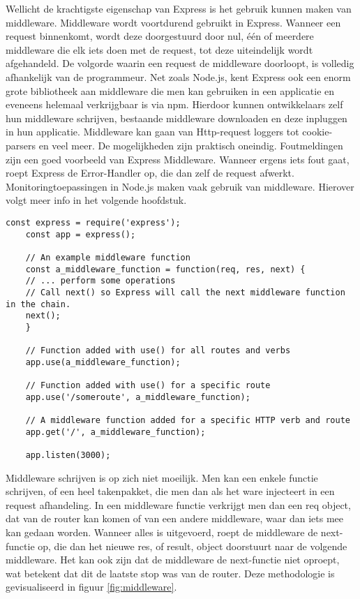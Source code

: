 Wellicht de krachtigste eigenschap van Express is het gebruik kunnen maken van middleware. Middleware wordt voortdurend gebruikt in Express. Wanneer een request binnenkomt, wordt deze doorgestuurd door nul, één of meerdere middleware die elk iets doen met de request, tot deze uiteindelijk wordt afgehandeld. De volgorde waarin een request de middleware doorloopt, is volledig afhankelijk van de programmeur. Net zoals Node.js, kent Express ook een enorm grote bibliotheek aan middleware die men kan gebruiken in een applicatie en eveneens helemaal verkrijgbaar is via npm. Hierdoor kunnen ontwikkelaars zelf hun middleware schrijven, bestaande middleware downloaden en deze inpluggen in hun applicatie. Middleware kan gaan van Http-request loggers tot cookie-parsers en veel meer. De mogelijkheden zijn praktisch oneindig. Foutmeldingen zijn een goed voorbeeld van Express Middleware. Wanneer ergens iets fout gaat, roept Express de Error-Handler op, die dan zelf de request afwerkt. Monitoringtoepassingen in Node.js maken vaak gebruik van middleware. Hierover volgt meer info in het volgende hoofdstuk.

\begin{minipage}{\linewidth}
	\begin{lstlisting}[style=ES6,
						caption={Express code flow voorbeeld.},
						label=code:expressexample]
	const express = require('express');
	const app = express();
	
	// An example middleware function
	const a_middleware_function = function(req, res, next) {
	// ... perform some operations
	// Call next() so Express will call the next middleware function in the chain.
	next();
	}
	
	// Function added with use() for all routes and verbs
	app.use(a_middleware_function);
	
	// Function added with use() for a specific route
	app.use('/someroute', a_middleware_function);
	
	// A middleware function added for a specific HTTP verb and route
	app.get('/', a_middleware_function);
	
	app.listen(3000);
	\end{lstlisting}
\end{minipage}	
	
Middleware schrijven is op zich niet moeilijk. Men kan een enkele functie schrijven, of een heel takenpakket, die men dan als het ware injecteert in een request afhandeling. In een middleware functie verkrijgt men dan een req object, dat van de router kan komen of van een andere middleware, waar dan iets mee kan gedaan worden. Wanneer alles is uitgevoerd, roept de middleware de next-functie op, die dan het nieuwe res, of result, object doorstuurt naar de volgende middleware. Het kan ook zijn dat de middleware de next-functie niet oproept, wat betekent dat dit de laatste stop was van de router. Deze methodologie is gevisualiseerd in figuur \ref{fig:middleware}.


